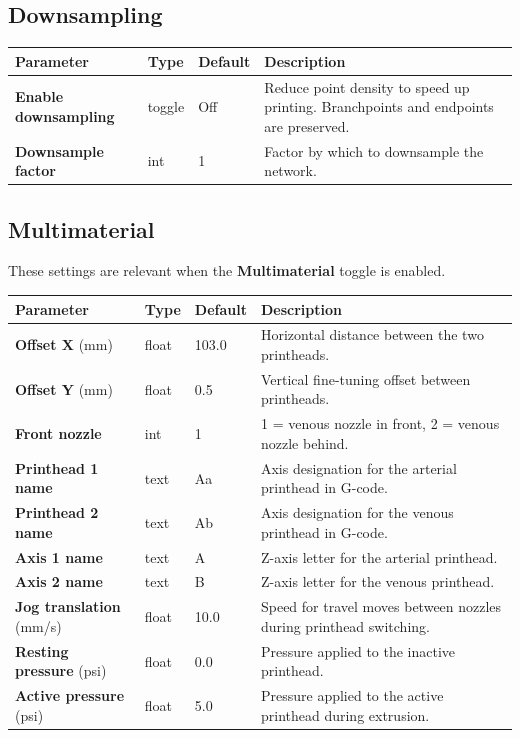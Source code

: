 \documentclass[11pt,letterpaper]{article}
\newcommand{\gui}[1]{\textcolor{guicolor}{\textsf{\textbf{#1}}}}
\begin{document}
\subsection{Downsampling}

\begin{tabularx}{\textwidth}{L{3.2cm} l l X}
\toprule
\textbf{Parameter} & \textbf{Type} & \textbf{Default} & \textbf{Description} \\
\midrule
\gui{Enable downsampling} & toggle & Off & Reduce point density to speed up printing. Branchpoints and endpoints are preserved. \\
\gui{Downsample factor} & int & 1 & Factor by which to downsample the network. \\
\bottomrule
\end{tabularx}

\subsection{Multimaterial}

These settings are relevant when the \gui{Multimaterial} toggle is enabled.

\begin{tabularx}{\textwidth}{L{3.2cm} l l X}
\toprule
\textbf{Parameter} & \textbf{Type} & \textbf{Default} & \textbf{Description} \\
\midrule
\gui{Offset X} (mm) & float & 103.0 & Horizontal distance between the two printheads. \\
\gui{Offset Y} (mm) & float & 0.5 & Vertical fine-tuning offset between printheads. \\
\gui{Front nozzle} & int & 1 & 1 = venous nozzle in front, 2 = venous nozzle behind. \\
\gui{Printhead 1 name} & text & Aa & Axis designation for the arterial printhead in G-code. \\
\gui{Printhead 2 name} & text & Ab & Axis designation for the venous printhead in G-code. \\
\gui{Axis 1 name} & text & A & Z-axis letter for the arterial printhead. \\
\gui{Axis 2 name} & text & B & Z-axis letter for the venous printhead. \\
\gui{Jog translation} (mm/s) & float & 10.0 & Speed for travel moves between nozzles during printhead switching. \\
\gui{Resting pressure} (psi) & float & 0.0 & Pressure applied to the inactive printhead. \\
\gui{Active pressure} (psi) & float & 5.0 & Pressure applied to the active printhead during extrusion. \\
\bottomrule
\end{tabularx}
\end{document}
